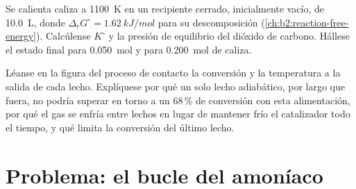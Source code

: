 \begin{exercise}[$\star\star\star$]\label{exo:b2:equilibrium-shifts:11}
Se calienta caliza a \qty{1100}{K} en un recipiente cerrado, inicialmente vacío, de
\qty{10.0}{L}, donde $\Delta_r G^\circ = \qty{1.62}{kJ/mol}$ para su
descomposición (\cref{ch:b2:reaction-free-energy}). Calcúlense $K^\circ$ y la
presión de equilibrio del dióxido de carbono. Hállese el estado final para
\qty{0.050}{mol} y para \qty{0.200}{mol} de caliza.
\end{exercise}

\begin{exercise}[$\star\star\star$]\label{exo:b2:equilibrium-shifts:12}
Léanse en la figura del proceso de contacto la conversión y la temperatura a la
salida de cada lecho. Explíquese por qué un solo lecho adiabático, por largo que fuera, no
podría superar en torno a un 68\,\% de conversión con esta alimentación, por qué el gas se enfría
entre lechos en lugar de mantener frío el catalizador todo el tiempo, y qué limita
la conversión del último lecho.
\end{exercise}

\section{Problema: el bucle del amoníaco}

